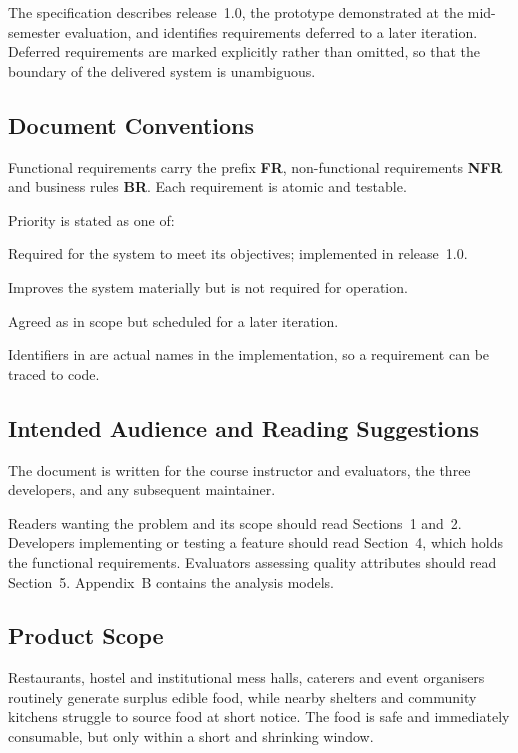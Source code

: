 \documentclass[11pt,a4paper]{article}
\newcommand{\code}[1]{\texttt{\detokenize{#1}}}
\begin{document}
The specification describes release~1.0, the prototype demonstrated at the
mid-semester evaluation, and identifies requirements deferred to a later
iteration. Deferred requirements are marked explicitly rather than omitted, so
that the boundary of the delivered system is unambiguous.

\subsection{Document Conventions}
Functional requirements carry the prefix \textbf{FR}, non-functional
requirements \textbf{NFR} and business rules \textbf{BR}. Each requirement is
atomic and testable.

Priority is stated as one of:
\begin{description}[leftmargin=2.6cm,style=nextline,font=\normalfont\bfseries]
  \item[Essential] Required for the system to meet its objectives; implemented in release~1.0.
  \item[Desirable] Improves the system materially but is not required for operation.
  \item[Deferred] Agreed as in scope but scheduled for a later iteration.
\end{description}

Identifiers in \code{monospace} are actual names in the implementation, so a
requirement can be traced to code.

\subsection{Intended Audience and Reading Suggestions}
The document is written for the course instructor and evaluators, the three
developers, and any subsequent maintainer.

Readers wanting the problem and its scope should read Sections~1 and~2.
Developers implementing or testing a feature should read Section~4, which holds
the functional requirements. Evaluators assessing quality attributes should read
Section~5. Appendix~B contains the analysis models.

\subsection{Product Scope}
Restaurants, hostel and institutional mess halls, caterers and event organisers
routinely generate surplus edible food, while nearby shelters and community
kitchens struggle to source food at short notice. The food is safe and
immediately consumable, but only within a short and shrinking window.
\end{document}
